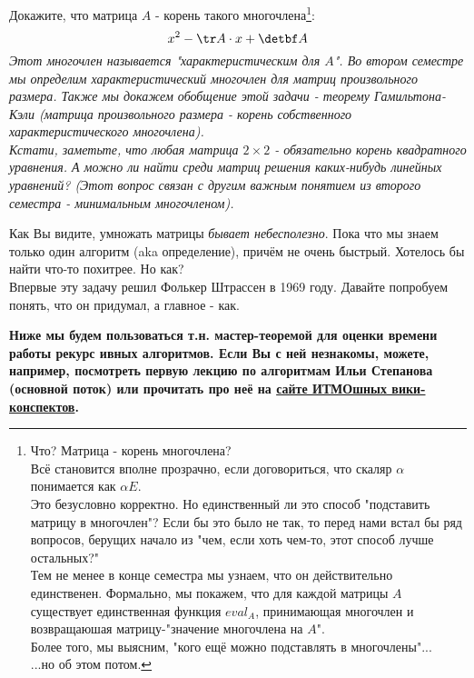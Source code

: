 	\begin{problem}
		Докажите, что матрица $A$ - корень такого многочлена\footnote{Что? Матрица - корень многочлена? 
			\\ Всё становится вполне прозрачно, если договориться, что скаляр $\alpha$ понимается как $\alpha E$. \\ Это безусловно корректно. Но единственный ли это способ "подставить матрицу в многочлен"? Если бы это было не так, то перед нами встал бы ряд вопросов, берущих начало из "чем, если хоть чем-то, этот способ лучше остальных?"
			\\ Тем не менее в конце семестра мы узнаем, что он действительно единственен. Формально, мы покажем, что для каждой матрицы $A$ существует единственная функция $eval_A$, принимающая многочлен и возвращаюшая матрицу-"значение многочлена на $A$". \\ Более того, мы выясним, "кого ещё можно подставлять в многочлены"... 
			\\ ...но об этом потом.}:
		$$x^2 - \tr A \cdot x + \detbf A$$
		\textit{Этот многочлен называется "характеристическим для $A$". Во втором семестре мы определим характеристический многочлен для матриц произвольного размера. Также мы докажем обобщение этой задачи - теорему Гамильтона-Кэли (матрица произвольного размера - корень собственного характеристического многочлена).\\
		Кстати, заметьте, что любая матрица $2 \times 2$ - обязательно корень квадратного уравнения. А можно ли найти среди матриц решения каких-нибудь линейных уравнений? (Этот вопрос связан с другим важным понятием из второго семестра - минимальным многочленом).} 
	\end{problem}

	
	Как Вы видите, умножать матрицы \textit{бывает небесполезно}. Пока что мы знаем только один алгоритм (aka определение), причём не очень быстрый. Хотелось бы найти что-то похитрее. Но как? \\
	Впервые эту задачу решил Фолькер Штрассен в 1969 году. Давайте попробуем понять, что он придумал, а главное - как. 
	
	\textbf{Ниже мы будем пользоваться т.н. мастер-теоремой для оценки времени работы рекурс ивных алгоритмов. Если Вы с ней незнакомы, можете, например, посмотреть первую лекцию по алгоритмам Ильи Степанова (основной поток) или прочитать про неё на \href{https://neerc.ifmo.ru/wiki/}{сайте ИТМОшных вики-конспектов}.}
	
